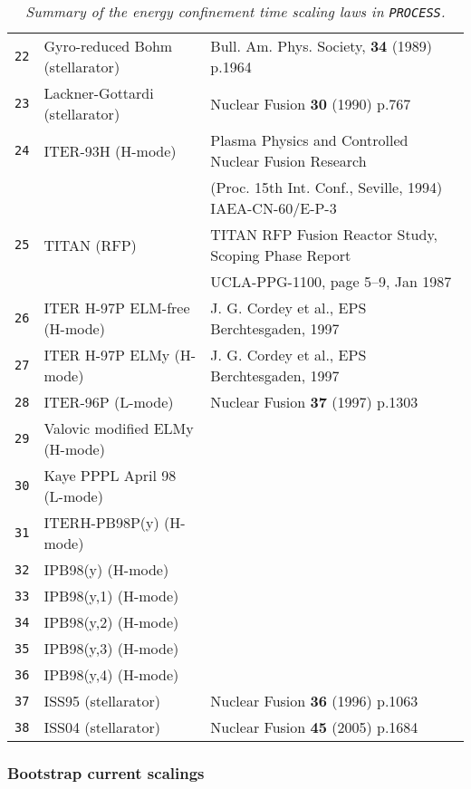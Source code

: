 \documentclass[11pt,a4paper]{report}
\newcommand{\process}{\mbox{\texttt{PROCESS}}}
\begin{document}
\begin{table}[tbph]
\begin{center}
\begin{tabular}{||c||l|l||}
\texttt{22} & Gyro-reduced Bohm (stellarator) & Bull. Am. Phys. Society, \textbf{34}
(1989) p.1964 \\
\texttt{23} & Lackner-Gottardi (stellarator) & Nuclear Fusion \textbf{30} (1990) p.767 \\
\texttt{24} & ITER-93H (H-mode) & Plasma Physics and Controlled Nuclear Fusion
Research \\
 & & (Proc. 15th Int. Conf., Seville, 1994) IAEA-CN-60/E-P-3 \\
\texttt{25} & TITAN (RFP) & TITAN RFP Fusion Reactor Study, Scoping Phase
Report \\
 & & UCLA-PPG-1100, page 5--9, Jan 1987 \\
\texttt{26} & ITER H-97P ELM-free (H-mode) & J. G. Cordey et al., EPS
Berchtesgaden, 1997 \\
\texttt{27} & ITER H-97P ELMy (H-mode) & J. G. Cordey et al., EPS
Berchtesgaden, 1997 \\
\texttt{28} & ITER-96P (L-mode) & Nuclear Fusion \textbf{37} (1997) p.1303 \\
\texttt{29} & Valovic modified ELMy (H-mode) &  \\
\texttt{30} & Kaye PPPL April 98 (L-mode) &  \\
\texttt{31} & ITERH-PB98P(y) (H-mode) &  \\
\texttt{32} & IPB98(y) (H-mode) &  \\
\texttt{33} & IPB98(y,1) (H-mode) &  \\
\texttt{34} & IPB98(y,2) (H-mode) &  \\
\texttt{35} & IPB98(y,3) (H-mode) &  \\
\texttt{36} & IPB98(y,4) (H-mode) &  \\
\texttt{37} & ISS95 (stellarator) & Nuclear Fusion \textbf{36} (1996) p.1063 \\
\texttt{38} & ISS04 (stellarator) & Nuclear Fusion \textbf{45} (2005) p.1684 \\
\hline
\end{tabular}
\normalsize
\end{center}
\caption[List of available energy confinement scaling laws]
{\label{tab:scaling_laws}
  \textit{Summary of the energy confinement time scaling laws in \process.}
}
\end{table}

\subsubsection{Bootstrap current scalings}
\label{sec:bootstrap}
\end{document}
